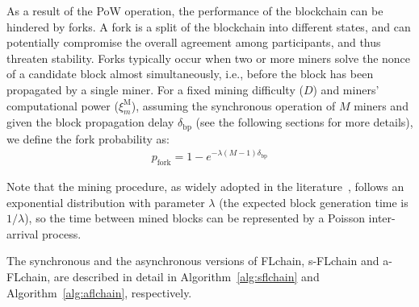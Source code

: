 \documentclass[lettersize,journal]{IEEEtran}
\begin{document}
As a result of the PoW operation, the performance of the blockchain can be hindered by forks. A fork is a split of the blockchain into different states, and can potentially compromise the overall agreement among participants, and thus threaten stability. Forks typically occur when two or more miners solve the nonce of a candidate block almost simultaneously, i.e., before the block has been propagated by a single miner. For a fixed mining difficulty ($D$) and miners' computational power ($\xi_m^\text{M}$), assuming the synchronous operation of $M$ miners and given the block propagation delay $\delta_\text{bp}$ (see the following sections for more details), we define the fork probability as:
\begin{equation}
\begin{split}
p_\text{fork} = 1 - e^{-\lambda(M-1)\delta_\text{bp}}
\end{split}
\label{eq:fork_probability}
\end{equation}

Note that the mining procedure, as widely adopted in the literature~\cite{decker2013information}, follows an exponential distribution with parameter $\lambda$ (the expected block generation time is $1/\lambda$), so the time between mined blocks can be represented by a Poisson inter-arrival process.

The synchronous and the asynchronous versions of FLchain, s-FLchain and a-FLchain, are described in detail in Algorithm~\ref{alg:sflchain} and Algorithm~\ref{alg:aflchain}, respectively.
\end{document}
